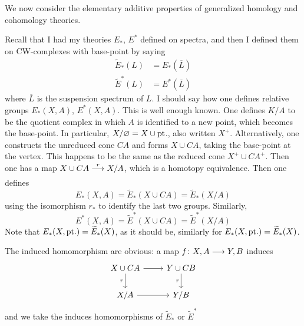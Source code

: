 \documentclass[../main]{subfiles}
\begin{document}
    We now consider the elementary additive properties of generalized homology and cohomology theories.
    
    Recall that I had my theories $E_\ast$, $E^\ast$ defined on spectra, and then I defined them on CW-complexes with base-point by saying
    \begin{align}
        \widetilde{E}_\ast(L) &= E_\ast(\overline{L}) \nonumber \\
        \widetilde{E}^\ast(L) &= E^\ast(\overline{L}) \nonumber
    \end{align}
    where $\overline{L}$ is the suspension spectrum of $L$. I should say how one defines relative groups $E_\ast(X,A)$, $E^\ast(X, A)$. This is well enough known. One defines $K/A$ to be the quotient complex in which $A$ is identified to a new point, which becomes the base-point. In particular, $X/\varnothing=X\cup \mathrm{pt}$., also written $X^+$. Alternatively, one constructs the unreduced cone $CA$ and forms $X\cup CA$, taking the base-point at the vertex. This happens to be the same as the reduced cone $X^+ \cup CA^+$. Then one has a map $X\cup CA\vra{r} X/A$, which is a homotopy equivalence. Then one defines
    \[E_\ast(X,A) = \widetilde{E}_\ast(X\cup CA)=\widetilde{E}_\ast(X/A)\]
    using the isomorphism $r_\ast$ to identify the last two groups. Similarly,
    \[E^\ast(X,A) = \widetilde{E}^\ast(X\cup CA)=\widetilde{E}^\ast(X/A)\]
    Note that $E_\ast(X, \mathrm{pt}.)=\widetilde{E}_\ast(X)$, as it should be, similarly for $E_\ast(X, \mathrm{pt}.)=\widetilde{E}_\ast(X)$.
    
    The induced homomorphism are obvious: a map $f\colon X, A\longrightarrow Y, B$ induces
    \[\begin{tikzcd}
    	{X\cup CA} & {Y\cup CB} \\
    	{X/A} & {Y/B}
    	\arrow[from=1-1, to=1-2]
    	\arrow["r"', from=1-2, to=2-2]
    	\arrow["r"', from=1-1, to=2-1]
    	\arrow[from=2-1, to=2-2]
    \end{tikzcd}\]
    and we take the induces homomorphisms of $\widetilde{E}_\ast$ or $\widetilde{E}^\ast$
    
\end{document}
